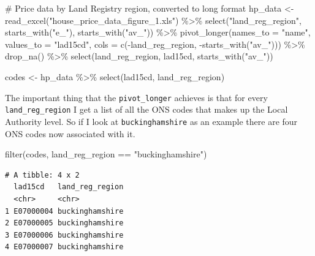 \documentclass[
  letterpaper,
]{book}
\newenvironment{Shaded}{\begin{snugshade}}{\end{snugshade}}
\newcommand{\AttributeTok}[1]{\textcolor[rgb]{0.40,0.45,0.13}{#1}}
\newcommand{\CommentTok}[1]{\textcolor[rgb]{0.37,0.37,0.37}{#1}}
\newcommand{\FunctionTok}[1]{\textcolor[rgb]{0.28,0.35,0.67}{#1}}
\newcommand{\NormalTok}[1]{\textcolor[rgb]{0.00,0.23,0.31}{#1}}
\newcommand{\OtherTok}[1]{\textcolor[rgb]{0.00,0.23,0.31}{#1}}
\newcommand{\SpecialCharTok}[1]{\textcolor[rgb]{0.37,0.37,0.37}{#1}}
\newcommand{\StringTok}[1]{\textcolor[rgb]{0.13,0.47,0.30}{#1}}
\begin{document}
\begin{Shaded}
\begin{Highlighting}[]
\CommentTok{\# Price data by Land Registry region, converted to long format}
\NormalTok{hp\_data }\OtherTok{\textless{}{-}} \FunctionTok{read\_excel}\NormalTok{(}\StringTok{"house\_price\_data\_figure\_1.xls"}\NormalTok{)  }\SpecialCharTok{\%\textgreater{}\%} 
  \FunctionTok{select}\NormalTok{(}\StringTok{"land\_reg\_region"}\NormalTok{, }\FunctionTok{starts\_with}\NormalTok{(}\StringTok{"e\_"}\NormalTok{), }\FunctionTok{starts\_with}\NormalTok{(}\StringTok{"av\_"}\NormalTok{)) }\SpecialCharTok{\%\textgreater{}\%} 
  \FunctionTok{pivot\_longer}\NormalTok{(}\AttributeTok{names\_to  =} \StringTok{"name"}\NormalTok{, }
               \AttributeTok{values\_to =} \StringTok{"lad15cd"}\NormalTok{, }
               \AttributeTok{cols      =} \FunctionTok{c}\NormalTok{(}\SpecialCharTok{{-}}\NormalTok{land\_reg\_region, }\SpecialCharTok{{-}}\FunctionTok{starts\_with}\NormalTok{(}\StringTok{"av\_"}\NormalTok{))) }\SpecialCharTok{\%\textgreater{}\%} 
  \FunctionTok{drop\_na}\NormalTok{() }\SpecialCharTok{\%\textgreater{}\%}
  \FunctionTok{select}\NormalTok{(land\_reg\_region, lad15cd, }\FunctionTok{starts\_with}\NormalTok{(}\StringTok{"av\_"}\NormalTok{)) }

\NormalTok{codes }\OtherTok{\textless{}{-}}\NormalTok{ hp\_data }\SpecialCharTok{\%\textgreater{}\%} 
  \FunctionTok{select}\NormalTok{(lad15cd, land\_reg\_region) }
\end{Highlighting}
\end{Shaded}

The important thing that the \texttt{pivot\_longer} achieves is that for
every \texttt{land\_reg\_region} I get a list of all the ONS codes that
makes up the Local Authority level. So if I look at
\texttt{buckinghamshire} as an example there are four ONS codes now
associated with it.

\begin{Shaded}
\begin{Highlighting}[]
\FunctionTok{filter}\NormalTok{(codes, land\_reg\_region }\SpecialCharTok{==} \StringTok{"buckinghamshire"}\NormalTok{)}
\end{Highlighting}
\end{Shaded}

\begin{verbatim}
# A tibble: 4 x 2
  lad15cd   land_reg_region
  <chr>     <chr>          
1 E07000004 buckinghamshire
2 E07000005 buckinghamshire
3 E07000006 buckinghamshire
4 E07000007 buckinghamshire
\end{verbatim}
\end{document}
